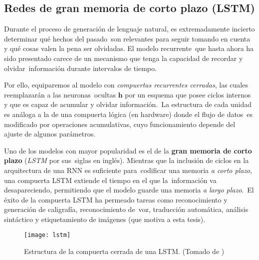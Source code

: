 \subsection{Redes de gran memoria de corto plazo (LSTM)}

Durante el proceso de generación de lenguaje natural, es extremadamente incierto determinar qué hechos del pasado\
son relevantes para seguir tomando en cuenta y qué cosas valen la pena ser olvidadas. El modelo recurrente\
que hasta ahora ha sido presentado carece de un mecanismo que tenga la capacidad de recordar y olvidar\
información durante intervalos de tiempo.\par
Por ello, equiparemos al modelo con \emph{compuertas recurrentes cerradas}, las cuales reemplazarán a las neuronas\
ocultas $\mathbf{h}$ por un esquema que posee ciclos internos y que es capaz de acumular y olvidar información.\
La estructura de cada unidad es análoga a la de una compuerta lógica (en hardware) donde el flujo de datos\
es modificado por operaciones acumulativas, cuyo funcionamiento depende del ajuste de algunos parámetros.\par
Uno de los modelos con mayor popularidad es el de la \textbf{gran memoria de corto plazo} (\emph{LSTM} por sus\
siglas en inglés). Mientras que la inclusión de ciclos en la arquitectura de una RNN es suficiente para\
codificar una memoria \emph{a corto plazo}, una compuerta LSTM extiende el tiempo en el que la\
información va desapareciendo, permitiendo que el modelo guarde una memoria \emph{a largo plazo}.\
El éxito de la compuerta LSTM ha permeado tareas como reconocimiento y generación de caligrafía, reconocimiento de\
voz, traducción automática, análisis sintáctico y etiquetamiento de imágenes (que motiva a esta tesis).

\begin{figure}[H]
  \centering
  \texttt{[image: lstm]}
  \caption{Estructura de la compuerta cerrada de una LSTM.
    (Tomado de \cite{goodfellow-et-al-2016})}
  \label{lstm_fig}
\end{figure}

